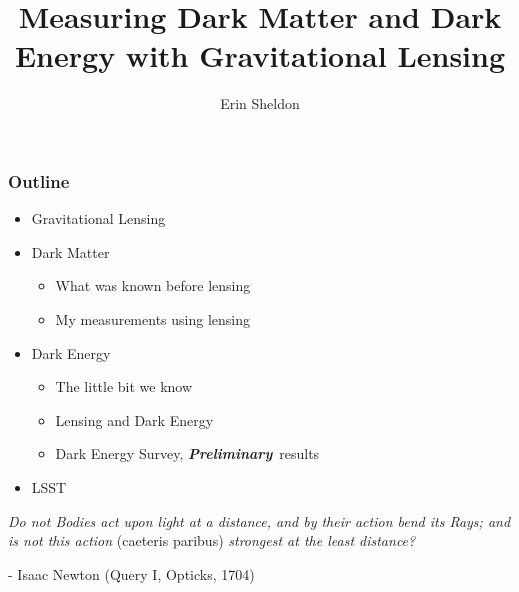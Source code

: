 \documentclass{beamer}
\title{Measuring Dark Matter and Dark Energy with Gravitational Lensing}
\author{Erin Sheldon}
\institute{Brookhaven National Laboratory}
\newcommand{\prelim}{{\bf{\it Preliminary}}}
\begin{document}
\frame{\titlepage}


\frame
{
    \frametitle{Outline}

    \begin{itemize}

        \item Gravitational Lensing

        \item Dark Matter

            \begin{itemize}
                \item What was known before lensing
                \item My measurements using lensing
            \end{itemize}

        \item Dark Energy
            \begin{itemize}
                \item The little bit we know
                \item Lensing and Dark Energy
                \item Dark Energy Survey, \prelim\ results
            \end{itemize}

        \item LSST

    \end{itemize}


}

\frame
{

    {\Large 
        {\em Do not Bodies act upon light at a distance, and by their action bend its Rays;
        and is not this action } (caeteris paribus) {\em strongest at the least distance?}
        \newline

        \hfill - Isaac Newton (Query I, Opticks, 1704)
    }
}
\end{document}
